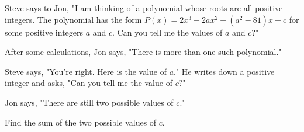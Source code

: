 Steve says to Jon, "I am thinking of a polynomial whose roots are all positive integers. The polynomial has the form $P(x)=2x^3-2ax^2+(a^2-81)x-c$ for some positive integers $a$ and $c$. Can you tell me the values of $a$ and $c$?"

After some calculations, Jon says, "There is more than one such polynomial."

Steve says, "You’re right. Here is the value of $a$." He writes down a positive integer and asks, "Can you tell me the value of $c$?"

Jon says, "There are still two possible values of $c$."

Find the sum of the two possible values of $c$.